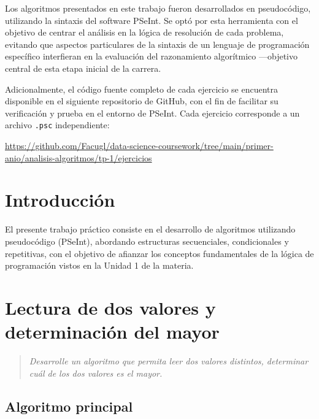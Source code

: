 \documentclass[12pt]{article}
\newcommand{\pseudocodigo}[2]{%
}
\newcommand{\enunciado}[1]{%
    \begin{quote}
        \itshape #1
    \end{quote}
}
\begin{document}
Los algoritmos presentados en este trabajo fueron desarrollados en pseudocódigo, utilizando la sintaxis del software PSeInt. Se optó por esta herramienta con el objetivo de centrar el análisis en la lógica de resolución de cada problema, evitando que aspectos particulares de la sintaxis de un lenguaje de programación específico interfieran en la evaluación del razonamiento algorítmico —objetivo central de esta etapa inicial de la carrera.

Adicionalmente, el código fuente completo de cada ejercicio se encuentra disponible en el siguiente repositorio de GitHub, con el fin de facilitar su verificación y prueba en el entorno de PSeInt. Cada ejercicio corresponde a un archivo \texttt{.psc} independiente:

\begin{center}
    \url{https://github.com/Facugl/data-science-coursework/tree/main/primer-anio/analisis-algoritmos/tp-1/ejercicios}
\end{center}

\section*{Introducción}

El presente trabajo práctico consiste en el desarrollo de algoritmos utilizando pseudocódigo (PSeInt), abordando estructuras secuenciales, condicionales y repetitivas, con el objetivo de afianzar los conceptos fundamentales de la lógica de programación vistos en la Unidad 1 de la materia.


\newpage
\section{Lectura de dos valores y determinación del mayor}

\enunciado{Desarrolle un algoritmo que permita leer dos valores distintos, determinar cuál de los dos valores es el mayor.}

\subsection{Algoritmo principal}

\pseudocodigo{ej01_mayor_de_dos}{Determinar el mayor de dos valores}

\end{document}
